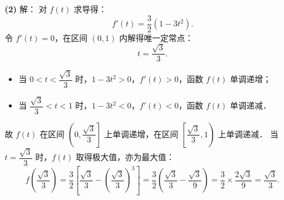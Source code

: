 \begin{answer}
\textbf{(2)} 解：
对 $f(t)$ 求导得：
\nopagebreak[4]
\[
f'(t) = \frac{3}{2}(1 - 3t^2).
\]
令 $f'(t) = 0$，在区间 $(0, 1)$ 内解得唯一定常点：
\nopagebreak[4]
\[
t = \frac{\sqrt{3}}{3}.
\]
\begin{itemize}
\item 当 $0 < t < \dfrac{\sqrt{3}}{3}$ 时，$1 - 3t^2 > 0$，$f'(t) > 0$，函数 $f(t)$ 单调递增；
\item 当 $\dfrac{\sqrt{3}}{3} < t < 1$ 时，$1 - 3t^2 < 0$，$f'(t) < 0$，函数 $f(t)$ 单调递减．
\end{itemize}
故 $f(t)$ 在区间 $\left(0, \dfrac{\sqrt{3}}{3}\right]$ 上单调递增，在区间 $\left[\dfrac{\sqrt{3}}{3}, 1\right)$ 上单调递减．
当 $t = \dfrac{\sqrt{3}}{3}$ 时，$f(t)$ 取得极大值，亦为最大值：
\nopagebreak[4]
\[
f\left(\frac{\sqrt{3}}{3}\right) = \frac{3}{2}\left[\frac{\sqrt{3}}{3} - \left(\frac{\sqrt{3}}{3}\right)^3\right] = \frac{3}{2}\left(\frac{\sqrt{3}}{3} - \frac{\sqrt{3}}{9}\right) = \frac{3}{2} \times \frac{2\sqrt{3}}{9} = \frac{\sqrt{3}}{3}.
\]


\gkanswer{答案（2）：$f(t)$ 在 $\left(0, \dfrac{\sqrt{3}}{3}\right]$ 上单调递增，在 $\left[\dfrac{\sqrt{3}}{3}, 1\right)$ 上单调递减；最大值为 $\dfrac{\sqrt{3}}{3}$。}

\end{answer}
